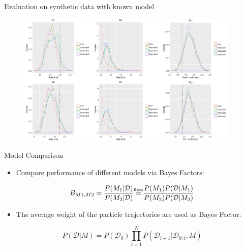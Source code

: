\documentclass[pdf]
{beamer}
\newcommand\bayeseq{\mathrel{\overset{\makebox[0pt]{\mbox{\normalfont\tiny\sffamily Bayes}}}{=}}}
\begin{document}
\begin{frame}{Evaluation on synthetic data with known model}

	\begin{figure}[ht]
		\begin{center}
			\includegraphics[height=2.5in]{figures/test_vertical.PNG}
		\end{center}
	\end{figure}
\end{frame}

\begin{frame}{Model Comparison}
	\begin{itemize}
		\item Compare performance of different models via Bayes Factors:
	\end{itemize}
	
	\begin{equation}
		B_{M1, M2} = \frac{P(M_1 | \mathcal{D})}{P(M_2 | \mathcal{D})}  \bayeseq \frac{P(M_1) P(\mathcal{D}| M_1)}{P(M_2) P(\mathcal{D} | M_2)} \label{eq:6}
	\end{equation}

	\begin{itemize}
		\item The average weight of the particle trajectories are used as Bayes Factor:
	\end{itemize}

	\begin{equation}
	P(\mathcal{D} | M) = P(\mathcal{D_0}) \prod_{l=1}^{N} P(\mathcal{D}_{i+1} | \mathcal{D}_{0:i}, M)\label{eq:7}
	\end{equation}

\end{frame}
\end{document}
